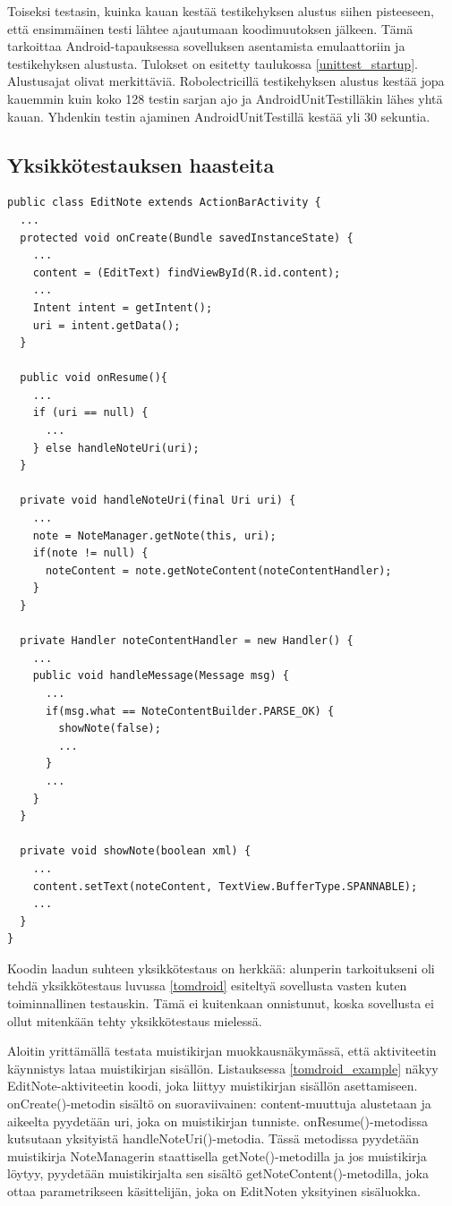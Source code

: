 Toiseksi testasin, kuinka kauan kestää testikehyksen alustus siihen pisteeseen, että ensimmäinen testi lähtee ajautumaan koodimuutoksen jälkeen. Tämä tarkoittaa Android-tapauksessa sovelluksen asentamista emulaattoriin ja testikehyksen alustusta. Tulokset on esitetty taulukossa \ref{unittest_startup}. Alustusajat olivat merkittäviä. Robolectricillä testikehyksen alustus kestää jopa kauemmin kuin koko 128 testin sarjan ajo ja AndroidUnitTestilläkin lähes yhtä kauan. Yhdenkin testin ajaminen AndroidUnitTestillä kestää yli 30 sekuntia.

\subsection{Yksikkötestauksen haasteita}

\begin{lstlisting}[float, label=tomdroid_example,caption=Tomdroid-koodiesimerkki]
public class EditNote extends ActionBarActivity {
  ...
  protected void onCreate(Bundle savedInstanceState) {
    ...
    content = (EditText) findViewById(R.id.content);
    ...
    Intent intent = getIntent();
    uri = intent.getData();
  }  
  
  public void onResume(){
    ...
    if (uri == null) {
  	  ...
    } else handleNoteUri(uri);
  }

  private void handleNoteUri(final Uri uri) {
    ...
    note = NoteManager.getNote(this, uri);
    if(note != null) {
      noteContent = note.getNoteContent(noteContentHandler);
    }
  }
  
  private Handler noteContentHandler = new Handler() {
    ...
    public void handleMessage(Message msg) {
      ...
      if(msg.what == NoteContentBuilder.PARSE_OK) {
      	showNote(false);
      	...
      }
      ...
    }
  }
  
  private void showNote(boolean xml) {
    ...
    content.setText(noteContent, TextView.BufferType.SPANNABLE);
    ...
  }
}
\end{lstlisting}

Koodin laadun suhteen yksikkötestaus on herkkää: alunperin tarkoitukseni oli tehdä yksikkötestaus luvussa \ref{tomdroid} esiteltyä sovellusta vasten kuten toiminnallinen testauskin. Tämä ei kuitenkaan onnistunut, koska sovellusta ei ollut mitenkään tehty yksikkötestaus mielessä.

Aloitin yrittämällä testata muistikirjan muokkausnäkymässä, että aktiviteetin käynnistys lataa muistikirjan sisällön. Listauksessa \ref{tomdroid_example} näkyy EditNote-aktiviteetin koodi, joka liittyy muistikirjan sisällön asettamiseen. onCreate()-metodin sisältö on suoraviivainen: content-muuttuja alustetaan ja aikeelta pyydetään uri, joka on muistikirjan tunniste. onResume()-metodissa kutsutaan yksityistä handleNoteUri()-metodia. Tässä metodissa pyydetään muistikirja NoteManagerin staattisella getNote()-metodilla ja jos muistikirja löytyy, pyydetään muistikirjalta sen sisältö getNoteContent()-metodilla, joka ottaa parametrikseen käsittelijän, joka on EditNoten yksityinen sisäluokka. 

